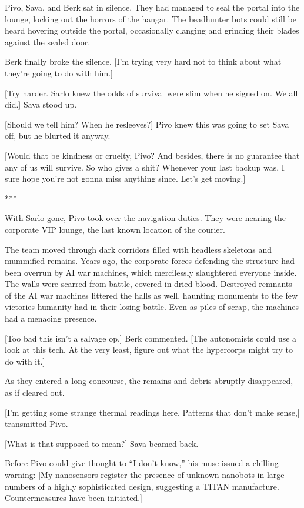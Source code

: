 Pivo, Sava, and Berk sat in silence. They had managed to seal the
portal into the lounge, locking out the horrors of the hangar. The
headhunter bots could still be heard hovering outside the portal,
occasionally clanging and grinding their blades against the sealed
door.

Berk finally broke the silence. [I'm trying very hard not to think
about what they're going to do with him.]

[Try harder. Sarlo knew the odds of survival were slim when he signed
on. We all did.] Sava stood up.

[Should we tell him? When he resleeves?] Pivo knew this was going to
set Sava off, but he blurted it anyway.

[Would that be kindness or cruelty, Pivo? And besides, there is no
guarantee that any of us will survive. So who gives a shit? Whenever
your last backup was, I sure hope you're not gonna miss anything
since. Let's get moving.]

\begin{center}
  ***
\end{center}

With Sarlo gone, Pivo took over the navigation duties.  They were
nearing the corporate VIP lounge, the last known location of the
courier.

The team moved through dark corridors filled with headless skeletons
and mummified remains. Years ago, the corporate forces defending the
structure had been overrun by AI war machines, which mercilessly
slaughtered everyone inside. The walls were scarred from battle,
covered in dried blood. Destroyed remnants of the AI war machines
littered the halls as well, haunting monuments to the few victories
humanity had in their losing battle. Even as piles of scrap, the
machines had a menacing presence.

[Too bad this isn't a salvage op,] Berk commented. [The autonomists
could use a look at this tech. At the very least, figure out what the
hypercorps might try to do with it.]

As they entered a long concourse, the remains and debris abruptly
disappeared, as if cleared out.

[I'm getting some strange thermal readings here. Patterns that don't
make sense,] transmitted Pivo.

[What is that supposed to mean?] Sava beamed back.

Before Pivo could give thought to ``I don't know,'' his muse issued a
chilling warning: [My nanosensors register the presence of unknown
nanobots in large numbers of a highly sophisticated design, suggesting
a TITAN manufacture. Countermeasures have been initiated.]

